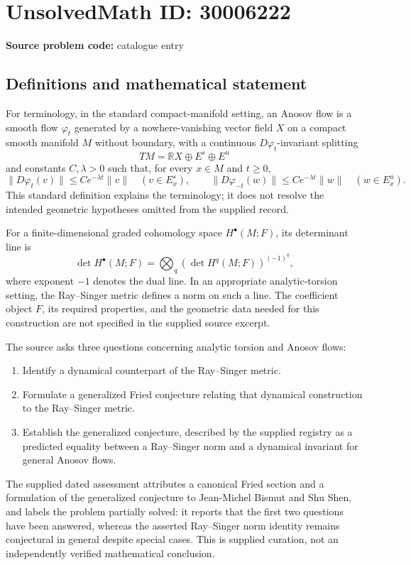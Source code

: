 \documentclass[11pt]{article}
\newcommand{\R}{\mathbb{R}}
\begin{document}
\section*{UnsolvedMath ID: 30006222}
\textbf{Source problem code:} catalogue entry
\subsection{Definitions and mathematical statement}
For terminology, in the standard compact-manifold setting, an Anosov flow is a smooth flow \(\varphi_t\) generated by a nowhere-vanishing vector field \(X\) on a compact smooth manifold \(M\) without boundary, with a continuous \(D\varphi_t\)-invariant splitting
\[
TM=\R X\oplus E^s\oplus E^u
\]
and constants \(C,\lambda>0\) such that, for every \(x\in M\) and \(t\geq 0\),
\[
\|D\varphi_t(v)\|\leq Ce^{-\lambda t}\|v\|\quad(v\in E_x^s),
\qquad
\|D\varphi_{-t}(w)\|\leq Ce^{-\lambda t}\|w\|\quad(w\in E_x^u).
\]
This standard definition explains the terminology; it does not resolve the intended geometric hypotheses omitted from the supplied record.

For a finite-dimensional graded cohomology space \(H^\bullet(M;F)\), its determinant line is
\[
\det H^\bullet(M;F)=\bigotimes_q\left(\det H^q(M;F)\right)^{(-1)^q},
\]
where exponent \(-1\) denotes the dual line. In an appropriate analytic-torsion setting, the Ray--Singer metric defines a norm on such a line. The coefficient object \(F\), its required properties, and the geometric data needed for this construction are not specified in the supplied source excerpt.

The source asks three questions concerning analytic torsion and Anosov flows:
\begin{enumerate}
\item Identify a dynamical counterpart of the Ray--Singer metric.
\item Formulate a generalized Fried conjecture relating that dynamical construction to the Ray--Singer metric.
\item Establish the generalized conjecture, described by the supplied registry as a predicted equality between a Ray--Singer norm and a dynamical invariant for general Anosov flows.
\end{enumerate}
The supplied dated assessment attributes a canonical Fried section and a formulation of the generalized conjecture to Jean-Michel Bismut and Shu Shen, and labels the problem partially solved: it reports that the first two questions have been answered, whereas the asserted Ray--Singer norm identity remains conjectural in general despite special cases. This is supplied curation, not an independently verified mathematical conclusion.
\end{document}
